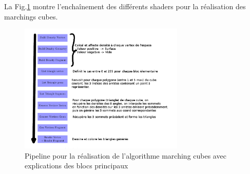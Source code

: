 \documentclass[a4paper]{article}
\begin{document}
La Fig.\ref{pipeline} montre l’enchaînement des différents shaders pour la réalisation des marchings cubes.

\begin{figure}[H]
\centering
\includegraphics[width=0.7\textwidth]{figures/pipeline3.png}
\caption{Pipeline pour la réalisation de l'algorithme marching cubes avec explications des blocs principaux}
\label{pipeline}
\end{figure}
%
%
%
%
%
%
%
%
%
%
%
%
%
%
%
%
%
\end{document}
